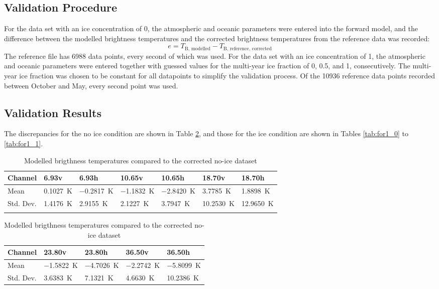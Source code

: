 \documentclass[11pt, a4paper]{article}
\begin{document}
\subsection{Validation Procedure}

For the data set with an ice concentration of 0, the atmospheric and oceanic parameters were entered into the forward model, and the difference between the modelled brightness temperatures and the corrected brightness temperatures from the reference data was recorded:
\[
e=T_\text{B, modelled} - T_\text{B, reference, corrected}
\]
The reference file has 6988 data points, every second of which was used. For the data set with an ice concentration of 1, the atmospheric and oceanic parameters were entered together with guessed values for the multi-year ice fraction of 0, 0.5, and 1, consecutively. The multi-year ice fraction was chosen to be constant for all datapoints to simplify the validation process. Of the 10936 reference data points recorded between October and May, every second point was used.


\subsection{Validation Results}
\label{sec:ForValRes}

The discrepancies for the no ice condition are shown in Table \ref{tab:for0}, and those for the ice condition are shown in Tables \ref{tab:for1_0} to \ref{tab:for1_1}.

\begin{table}[h!]
\centering
\begin{tabular}{@{} l l l l l l l @{}}
Channel & 6.93v & 6.93h & 10.65v & 10.65h & 18.70v & 18.70h \\
\midrule
Mean & \SI{0.1027}{K} & \SI{-0.2817}{K} & \SI{-1.1832}{K} & \SI{-2.8420}{K} & \SI{3.7785}{K} & \SI{1.8898}{K} \\
Std. Dev. & \SI{1.4176}{K} & \SI{2.9155}{K} & \SI{2.1227}{K} & \SI{3.7947}{K} & \SI{10.2530}{K} & \SI{12.9650}{K} \\
\midrule
\tabularnewline
\end{tabular}
\begin{tabular}{@{} l l l l l @{}}
Channel & 23.80v & 23.80h & 36.50v & 36.50h \\
\midrule
Mean & \SI{-1.5822}{K} & \SI{-4.7026}{K} & \SI{-2.2742}{K} & \SI{-5.8099}{K} \\
Std. Dev. & \SI{3.6383}{K} & \SI{7.1321}{K} & \SI{4.6630}{K} & \SI{10.2386}{K} \\
\midrule
\end{tabular}
\caption{Modelled brigthness temperatures compared to the corrected no-ice dataset}
\label{tab:for0}
\end{table}
\end{document}
